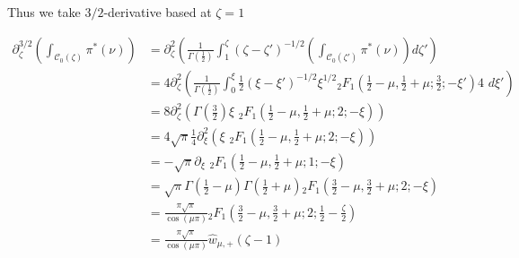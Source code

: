 \documentclass{article}
\begin{document}
Thus we take $3/2$-derivative based at $\zeta=1$

\begin{align*}
\partial_{\zeta}^{3/2}\left(\int_{\mathcal{C}_0(\zeta)}\pi^*(\nu)\right)&=\partial_\zeta^2\left(\frac{1}{\Gamma\left(\frac{1}{2}\right)}\int_1^\zeta(\zeta-\zeta')^{-1/2}\left(\int_{\mathcal{C}_0(\zeta')}\pi^*(\nu)\right)d\zeta'\right)\\
&=4\partial_\zeta^2\left(\frac{1}{\Gamma\left(\frac{1}{2}\right)}\int_0^\xi\frac{1}{2}(\xi-\xi')^{-1/2}\xi^{1/2} {}_2F_1\left(\frac{1}{2}-\mu,\frac{1}{2}+\mu;\frac{3}{2};-\xi'\right) 4\,\,d\xi'\right)\\
&=8\partial_\zeta^2\left(\Gamma\left(\frac{3}{2}\right)\xi\,\,{}_2F_1\left(\frac{1}{2}-\mu,\frac{1}{2}+\mu;2;-\xi\right)\right) \\
&=4\sqrt{\pi}\frac{1}{4}\partial_\xi^2\left(\xi\,\,{}_2F_1\left(\frac{1}{2}-\mu,\frac{1}{2}+\mu;2;-\xi\right)\right)\\
&=-\sqrt{\pi}\partial_{\xi}\,\, {}_2F_1\left(\frac{1}{2}-\mu,\frac{1}{2}+\mu;1;-\xi\right)\\
&=\sqrt{\pi}\Gamma\left(\frac{1}{2}-\mu\right)\Gamma\left(\frac{1}{2}+\mu\right){}_2F_1\left(\frac{3}{2}-\mu,\frac{3}{2}+\mu;2;-\xi\right)\\
&=\frac{\pi\sqrt{\pi}}{\cos(\mu \pi)}{}_2F_1\left(\frac{3}{2}-\mu,\frac{3}{2}+\mu;2;\frac{1}{2}-\frac{\zeta}{2}\right)\\
&=\frac{\pi\sqrt{\pi}}{\cos(\mu \pi)}\hat{w}_{\mu,+}(\zeta-1)
\end{align*}









\end{document}
